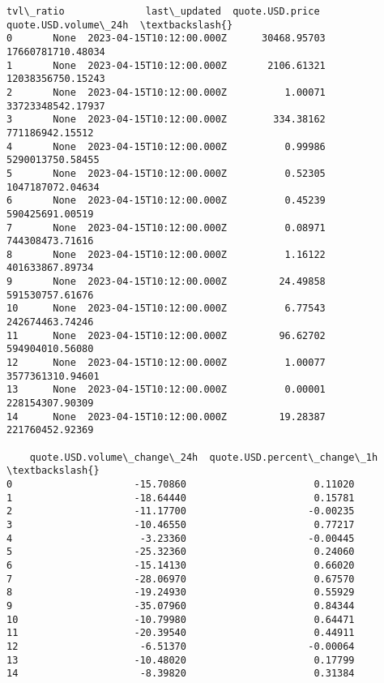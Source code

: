 \documentclass[11pt]{article}
\begin{document}
\begin{tcolorbox}[breakable, size=fbox, boxrule=.5pt, pad at break*=1mm, opacityfill=0]
\begin{Verbatim}[commandchars=\\\{\}]
   tvl\_ratio              last\_updated  quote.USD.price  quote.USD.volume\_24h  \textbackslash{}
0       None  2023-04-15T10:12:00.000Z      30468.95703     17660781710.48034
1       None  2023-04-15T10:12:00.000Z       2106.61321     12038356750.15243
2       None  2023-04-15T10:12:00.000Z          1.00071     33723348542.17937
3       None  2023-04-15T10:12:00.000Z        334.38162       771186942.15512
4       None  2023-04-15T10:12:00.000Z          0.99986      5290013750.58455
5       None  2023-04-15T10:12:00.000Z          0.52305      1047187072.04634
6       None  2023-04-15T10:12:00.000Z          0.45239       590425691.00519
7       None  2023-04-15T10:12:00.000Z          0.08971       744308473.71616
8       None  2023-04-15T10:12:00.000Z          1.16122       401633867.89734
9       None  2023-04-15T10:12:00.000Z         24.49858       591530757.61676
10      None  2023-04-15T10:12:00.000Z          6.77543       242674463.74246
11      None  2023-04-15T10:12:00.000Z         96.62702       594904010.56080
12      None  2023-04-15T10:12:00.000Z          1.00077      3577361310.94601
13      None  2023-04-15T10:12:00.000Z          0.00001       228154307.90309
14      None  2023-04-15T10:12:00.000Z         19.28387       221760452.92369

    quote.USD.volume\_change\_24h  quote.USD.percent\_change\_1h  \textbackslash{}
0                     -15.70860                      0.11020
1                     -18.64440                      0.15781
2                     -11.17700                     -0.00235
3                     -10.46550                      0.77217
4                      -3.23360                     -0.00445
5                     -25.32360                      0.24060
6                     -15.14130                      0.66020
7                     -28.06970                      0.67570
8                     -19.24930                      0.55929
9                     -35.07960                      0.84344
10                    -10.79980                      0.64471
11                    -20.39540                      0.44911
12                     -6.51370                     -0.00064
13                    -10.48020                      0.17799
14                     -8.39820                      0.31384


\end{Verbatim}
\end{tcolorbox}
\end{document}
